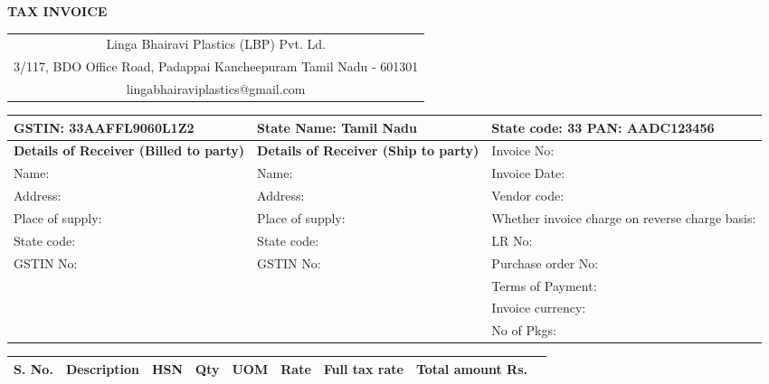 \documentclass[a4paper, 10pt]{article}
\begin{document}
\begin{center}
  \textbf{TAX INVOICE}
\end{center}

\begin{center}
\begin{tabular}{c}
  Linga Bhairavi Plastics (LBP) Pvt. Ld.
  \\
  3/117, BDO Office Road, Padappai
  Kancheepuram
  Tamil Nadu - 601301
  \\
  lingabhairaviplastics@gmail.com
\end{tabular}
\end{center}

\begin{tabularx}{\textwidth}{|X|X|X|}
  \hline
  GSTIN: 33AAFFL9060L1Z2 & State Name: Tamil Nadu & State code: 33 PAN: AADC123456\\
  \hline
  \textbf{Details of Receiver (Billed to party)} & \textbf{Details of Receiver (Ship to party)} & Invoice No: \\
  Name: & Name: & Invoice Date: \\
  Address: & Address: & Vendor code: \\
  Place of supply: & Place of supply: & Whether invoice charge on reverse charge basis: \\
  State code: & State code: & LR No: \\
  GSTIN No: & GSTIN No: & Purchase order No:\\
  && Terms of Payment:\\
  && Invoice currency:\\
  && No of Pkgs:\\
  \hline
\end{tabularx}

\begin{tabularx}{\textwidth}{|X|X|X|X|X|X|X|X|X|}
  \textbf{S. No.}&\textbf{Description}&\textbf{HSN}&\textbf{Qty}&\textbf{UOM}&\textbf{Rate}&\textbf{Full tax rate}&\textbf{Total amount Rs.}\\
  \hline
\end{tabularx}
\end{document}
